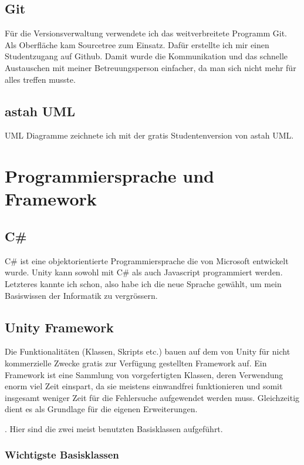 \subsection{Git}

Für die Versionsverwaltung verwendete ich das weitverbreitete Programm Git.
Als Oberfläche kam Sourcetree zum Einsatz.
Dafür erstellte ich mir einen Studentzugang auf Github.
Damit wurde die Kommunikation und das schnelle Austauschen mit meiner Betreuungsperson einfacher, da man sich nicht mehr für alles treffen musste.

\subsection{astah UML}

UML Diagramme zeichnete ich mit der gratis Studentenversion von astah UML.

\section{Programmiersprache und Framework}

\subsection{C\#}
C\# ist eine objektorientierte Programmiersprache die von Microsoft entwickelt wurde.
Unity kann sowohl mit C\# als auch Javascript programmiert werden.
Letzteres kannte ich schon, also habe ich die neue Sprache gewählt, um mein Basiswissen der Informatik zu vergrössern.

\subsection{Unity Framework}
Die Funktionalitäten (Klassen, Skripts etc.) bauen auf dem von Unity für nicht kommerzielle Zwecke gratis zur Verfügung gestellten Framework auf.
Ein Framework ist eine Sammlung von vorgefertigten Klassen, deren Verwendung enorm viel Zeit einspart, da sie meistens einwandfrei funktionieren und somit insgesamt weniger Zeit für die Fehlersuche aufgewendet werden muss. Gleichzeitig dient es als Grundlage für die eigenen Erweiterungen.

.
Hier sind die zwei meist benutzten Basisklassen aufgeführt.

\subsubsection{Wichtigste Basisklassen}

